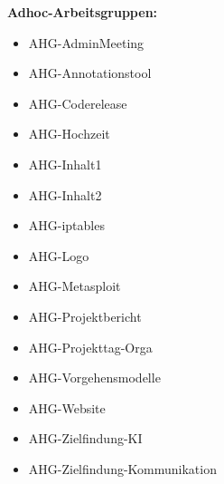 \begin{multicols}{2}
  \textbf{Adhoc-Arbeitsgruppen:}
  \begin{itemize}
	  \item AHG-AdminMeeting
	  \item AHG-Annotationstool
	  \item AHG-Coderelease
	  \item AHG-Hochzeit
	  \item AHG-Inhalt1
	  \item AHG-Inhalt2
	  \item AHG-iptables
	  \item AHG-Logo
	  \item AHG-Metasploit
	  \item AHG-Projektbericht
	  \item AHG-Projekttag-Orga
	  \item AHG-Vorgehensmodelle
	  \item AHG-Website
	  \item AHG-Zielfindung-KI
	  \item AHG-Zielfindung-Kommunikation
  \end{itemize}
\end{multicols}

